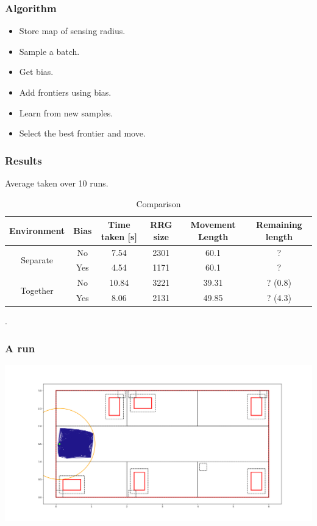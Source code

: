 \documentclass{beamer}
\begin{document}
\begin{frame}
	\frametitle{Algorithm}
	\begin{itemize}
		\item Store map of sensing radius. \pause
		\item Sample a batch. \pause
		\item Get bias.\pause
		\item Add frontiers using bias. \pause
		\item Learn from new samples.\pause
		\item Select the best frontier and move.
	\end{itemize}
	
\end{frame}

	\begin{frame}
		\frametitle{Results}
		\centering
		Average taken over 10 runs.
		\begin{table}
			\centering
			\tiny
			\begin{tabular}{|c|c|c|c|c|c|}
				\hline
				\textbf{Environment} & \textbf{Bias} & \textbf{Time taken [s]} & \textbf{RRG size} & \textbf{Movement Length} & \textbf{Remaining length}\\
				\hline
				\multirow{2}{*}{Separate} 
				& No  & 7.54 & 2301 & 60.1 & ? \\
				& Yes & 4.54 & 1171 & 60.1 & ? \\
				\hline
				\multirow{2}{*}{Together} 
				& No  & 10.84 & 3221 & 39.31 & ? (0.8) \\
				& Yes & 8.06  & 2131 & 49.85 & ? (4.3) \\
				\hline
			\end{tabular}
			\caption{Comparison}. \label{tab:results}
		\end{table}
	\end{frame}

\begin{frame}
	\frametitle{A run}
	\includegraphics[width=\textwidth]{firstMove.png}	
\end{frame}
\end{document}
